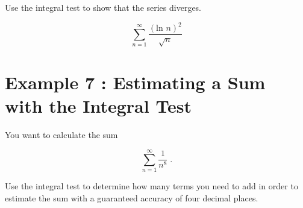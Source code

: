 \documentclass[11pt]{article}
\begin{document}
Use the integral test to show that the series diverges.

$$\sum_{n=1}^\infty \frac{\left(\text{ln } n\right)^2}{\sqrt{n}}$$

\newpage

\section*{Example 7 : Estimating a Sum with the Integral Test}

You want to calculate the sum

$$\sum_{n=1}^\infty \frac{1}{n^8} \;.$$

Use the integral test to determine how many terms you need to add in order to estimate the sum with a guaranteed accuracy of four decimal places.

\newpage
\end{document}
